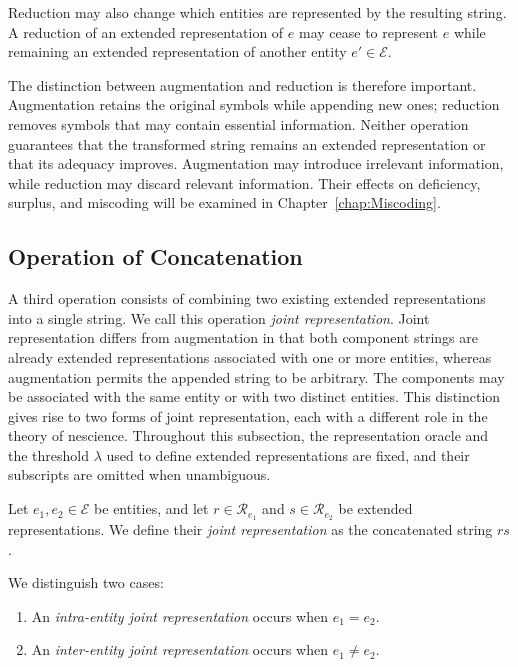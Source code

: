Reduction may also change which entities are represented by the resulting string. A reduction of an extended representation of $e$ may cease to represent $e$ while remaining an extended representation of another entity $e'\in\mathcal{E}$.

The distinction between augmentation and reduction is therefore important. Augmentation retains the original symbols while appending new ones; reduction removes symbols that may contain essential information. Neither operation guarantees that the transformed string remains an extended representation or that its adequacy improves. Augmentation may introduce irrelevant information, while reduction may discard relevant information. Their effects on deficiency, surplus, and miscoding will be examined in Chapter~\ref{chap:Miscoding}.


\subsection*{Operation of Concatenation}

A third operation consists of combining two existing extended representations into a single string. We call this operation \emph{joint representation}. Joint representation differs from augmentation in that both component strings are already extended representations associated with one or more entities, whereas augmentation permits the appended string to be arbitrary. The components may be associated with the same entity or with two distinct entities. This distinction gives rise to two forms of joint representation, each with a different role in the theory of nescience. Throughout this subsection, the representation oracle and the threshold $\lambda$ used to define extended representations are fixed, and their subscripts are omitted when unambiguous.

\begin{definition}
Let $e_1,e_2\in\mathcal{E}$ be entities, and let $r\in\mathcal{R}_{e_1}$ and $s\in\mathcal{R}_{e_2}$ be extended representations. We define their \emph{joint representation} as the concatenated string $rs$.

We distinguish two cases:
\begin{enumerate}
\item An \emph{intra-entity joint representation} occurs when $e_1=e_2$.
\item An \emph{inter-entity joint representation} occurs when $e_1\neq e_2$.
\end{enumerate}
\end{definition}


